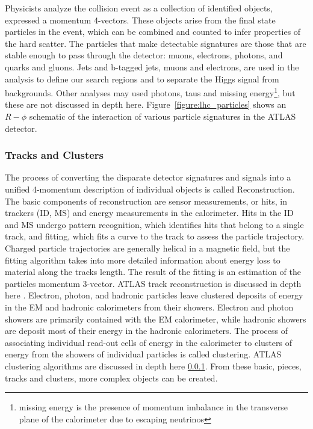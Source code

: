 Physicists analyze the collision event as a collection of identified objects, expressed a momentum 4-vectors. These objects arise from the final state particles in the event, which can be combined and counted to infer properties of the hard scatter. The particles that make detectable signatures are those that are stable enough to pass through the detector: muons, electrons, photons, and quarks and gluons. Jets and b-tagged jets, muons and electrons, are used in the \tth analysis to define our search regions and to separate the Higgs signal from backgrounds. Other analyses may used photons, taus and missing energy\footnote{missing energy is the presence of momentum imbalance in the transverse plane of the calorimeter due to escaping neutrinos}, but these are not discussed in depth here. Figure~\ref{figure:lhc_particles} shows an $R-\phi$ schematic of the interaction of various particle signatures in the ATLAS detector.  


 

\subsubsection{Tracks and Clusters}

The process of converting the disparate detector signatures and signals into a unified 4-momentum description of individual objects is called Reconstruction. The basic components of reconstruction are sensor measurements, or hits, in trackers (ID, MS) and energy measurements in the calorimeter. Hits in the ID and MS undergo pattern recognition, which identifies hits that belong to a single track, and fitting, which fits a curve to the track to assess the particle trajectory. Charged particle trajectories are generally helical in a magnetic field, but the fitting algorithm takes into more detailed information about energy loss to material along the tracks length. The result of the fitting is an estimation of the particles momentum 3-vector. ATLAS track reconstruction is discussed in depth here \cite{}. Electron, photon, and hadronic particles leave clustered deposits of energy in the EM and hadronic calorimeters from their showers. Electron and photon showers are primarily contained with the EM calorimeter, while hadronic showers are deposit most of their energy in the hadronic calorimeters. The process of associating individual read-out cells of energy in the calorimeter to clusters of energy from the showers of individual particles is called clustering. ATLAS clustering algorithms are discussed in depth here \ref{}. From these basic, pieces, tracks and clusters, more complex objects can be created. 

